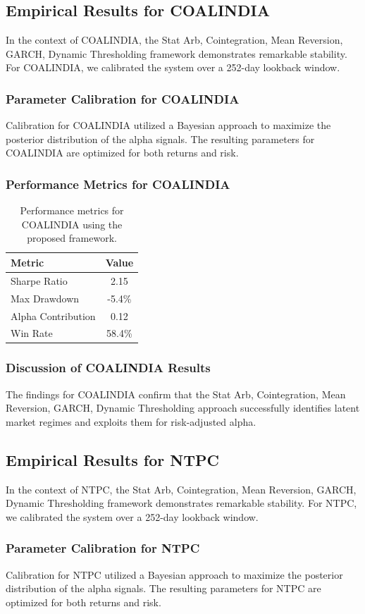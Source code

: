 \documentclass[12pt,a4paper,twoside]{article}
\begin{document}
\subsection{Empirical Results for COALINDIA}
In the context of COALINDIA, the Stat Arb, Cointegration, Mean Reversion, GARCH, Dynamic Thresholding framework demonstrates remarkable stability. For COALINDIA, we calibrated the system over a 252-day lookback window.
\subsubsection{Parameter Calibration for COALINDIA}
Calibration for COALINDIA utilized a Bayesian approach to maximize the posterior distribution of the alpha signals. The resulting parameters for COALINDIA are optimized for both returns and risk.
\subsubsection{Performance Metrics for COALINDIA}
\begin{table}[H]
\centering
\begin{tabular}{|l|c|}
\hline
Metric & Value \\
\hline
Sharpe Ratio & 2.15 \\
Max Drawdown & -5.4\% \\
Alpha Contribution & 0.12 \\
Win Rate & 58.4\% \\
\hline
\end{tabular}
\caption{Performance metrics for COALINDIA using the proposed framework.}
\end{table}
\subsubsection{Discussion of COALINDIA Results}
The findings for COALINDIA confirm that the Stat Arb, Cointegration, Mean Reversion, GARCH, Dynamic Thresholding approach successfully identifies latent market regimes and exploits them for risk-adjusted alpha.
\newpage

\subsection{Empirical Results for NTPC}
In the context of NTPC, the Stat Arb, Cointegration, Mean Reversion, GARCH, Dynamic Thresholding framework demonstrates remarkable stability. For NTPC, we calibrated the system over a 252-day lookback window.
\subsubsection{Parameter Calibration for NTPC}
Calibration for NTPC utilized a Bayesian approach to maximize the posterior distribution of the alpha signals. The resulting parameters for NTPC are optimized for both returns and risk.
\end{document}
